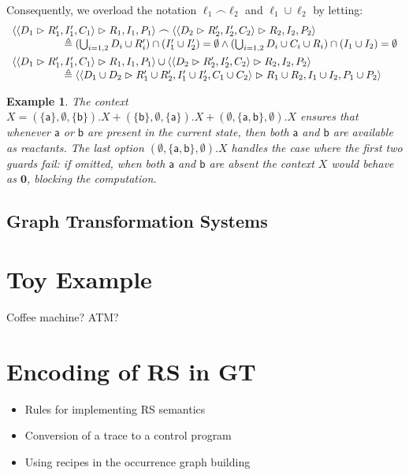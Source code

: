 \documentclass[sn-mathphys-num,a4paper,iicol,lineno,pdflatex]{sn-jnl-hacked}
\newcommand{\nil}{\mathbf{0}}
\newcommand{\obs}[2]{\langle #1\vartriangleright #2\rangle}
\theoremstyle{thmstyleone}%
\theoremstyle{thmstyletwo}%
\newtheorem{example}{Example}%
\theoremstyle{thmstylethree}%
\begin{document}
%
Consequently, we overload the notation $\ell_1\frown \ell_2$ and $\ell_1\cup \ell_2$ by letting:
%
{\footnotesize
\[
\begin{array}{l}
\obs{\obs{D_1}{R'_1,I'_1,C_1}}{R_1,I_1,P_1}
\frown
\obs{\obs{D_2}{R'_2,I'_2,C_2}}{R_2,I_2,P_2}
\\
\hspace{1.75cm}\triangleq (\textstyle\bigcup_{i=1,2} D_i\cup  R'_i) \cap (I'_1 \cup I'_2) = \emptyset
\wedge
(\bigcup_{i=1,2} D_i\cup  C_i\cup  R_i) \cap (I_1 \cup I_2) = \emptyset \\[5pt]
\obs{\obs{D_1}{R'_1,I'_1,C_1}}{R_1,I_1,P_1}
\cup
\obs{\obs{D_2}{R'_2,I'_2,C_2}}{R_2,I_2,P_2}
\\
\hspace{1.75cm}\triangleq \obs{\obs{D_1\cup D_2}{R'_1\cup R'_2,I'_1\cup I'_2,C_1\cup C_2}}{R_1\cup R_2,I_1\cup I_2,P_1\cup P_2}
\end{array}
\]}

\begin{example}
The context 
\(
X = (\{\mathsf{a}\},\emptyset,\{\mathsf{b}\}).X + (\{\mathsf{b}\},\emptyset,\{\mathsf{a}\}).X + (\emptyset,\{\mathsf{a},\mathsf{b}\},\emptyset).X
\)
ensures that whenever $\mathsf{a}$ or $\mathsf{b}$ are present in the current state, then both $\mathsf{a}$ and $\mathsf{b}$ are available as reactants.
The last option $(\emptyset,\{\mathsf{a},\mathsf{b}\},\emptyset).X$ handles the case where the first two guards fail: if omitted, when both $\mathsf{a}$ and $\mathsf{b}$ are absent the context $X$ would behave as $\nil$, blocking the computation.
\end{example}


\subsection{Graph Transformation Systems}

\section{Toy Example}

Coffee machine? ATM?

\section{Encoding of RS in GT}
\begin{itemize}
\item Rules for implementing RS semantics
\item Conversion of a trace to a control program
\item Using recipes in the occurrence graph building
\end{itemize}
\end{document}
